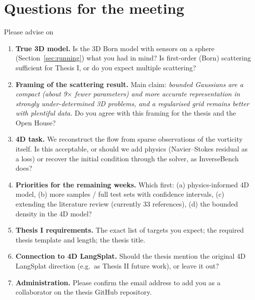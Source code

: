 \documentclass[11pt,a4paper]{article}
\newcommand{\ask}[1]{\textbf{\textcolor{orange!75!black}{#1}}}
\begin{document}
\section{Questions for the meeting}
\label{sec:questions}
\begin{qbox}{Please advise on}
\begin{enumerate}[leftmargin=*, itemsep=6pt]
\item \ask{True 3D model.} Is the 3D Born model with sensors on a sphere (Section~\ref{sec:running}) what you had in
mind? Is first-order (Born) scattering sufficient for Thesis I, or do you expect multiple scattering?
\item \ask{Framing of the scattering result.} Main claim: \emph{bounded Gaussians are a compact (about 9$\times$
fewer parameters) and more accurate representation in strongly under-determined 3D problems, and a regularised grid
remains better with plentiful data.} Do you agree with this framing for the thesis and the Open House?
\item \ask{4D task.} We reconstruct the flow from sparse observations of the vorticity itself. Is this acceptable, or
should we add physics (Navier--Stokes residual as a loss) or recover the initial condition through the solver, as
InverseBench does?
\item \ask{Priorities for the remaining weeks.} Which first: (a) physics-informed 4D model, (b) more samples / full
test sets with confidence intervals, (c) extending the literature review (currently 33 references), (d) the bounded
density in the 4D model?
\item \ask{Thesis I requirements.} The exact list of targets you expect; the required thesis template and length; the
thesis title.
\item \ask{Connection to 4D LangSplat.} Should the thesis mention the original 4D LangSplat direction (e.g.\ as Thesis
II future work), or leave it out?
\item \ask{Administration.} Please confirm the email address to add you as a collaborator on the thesis GitHub
repository.
\end{enumerate}
\end{qbox}
\end{document}
